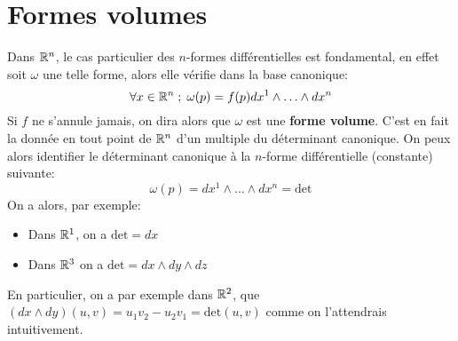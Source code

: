    \section{Formes volumes}
   Dans \(\mathbb{R}^n\), le cas particulier des \(n\)-formes différentielles est fondamental, en effet soit \( \omega \) une telle forme, alors elle vérifie dans la base canonique:
   \[ 
      \forall x \in \mathbb{R}^n \; ; \; \omega(p) =  f(p)dx^1 \wedge \ldots \wedge dx^n
   \]
   Si \( f \) ne s'annule jamais, on dira alors que \( \omega \) est une \textbf{forme volume}. C'est en fait la donnée en tout point de \( \mathbb{R}^n \) d'un multiple du déterminant canonique. On peux alors identifier le déterminant canonique à la \( n \)-forme différentielle (constante) suivante:
   \[ 
      \omega(p) = dx^1 \wedge \ldots \wedge dx^n = \text{det}
   \]
   On a alors, par exemple:
   \begin{itemize}
      \item Dans \(\mathbb{R}^1\), on a \(\text{det} = dx\)
      \item Dans \(\mathbb{R}^3\) on a \(\text{det} = dx \wedge dy \wedge dz\)
   \end{itemize}
   En particulier, on a par exemple dans \(\mathbb{R}^2\), que \((dx \wedge dy)(u, v) = u_1v_2 - u_2v_1 = \text{det}(u, v)\) comme on l'attendrais intuitivement.
